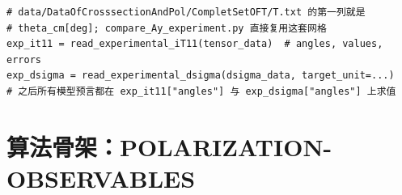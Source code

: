 \begin{lstlisting}[style=python, caption={从 T.txt 取实验角度网格}, label={lst:ch13-angles-from-exp}]
# data/DataOfCrosssectionAndPol/CompletSetOFT/T.txt 的第一列就是
# theta_cm[deg]; compare_Ay_experiment.py 直接复用这套网格
exp_it11 = read_experimental_iT11(tensor_data)  # angles, values, errors
exp_dsigma = read_experimental_dsigma(dsigma_data, target_unit=...)
# 之后所有模型预言都在 exp_it11["angles"] 与 exp_dsigma["angles"] 上求值
\end{lstlisting}

\section{算法骨架：POLARIZATION-OBSERVABLES}
\label{sec:ch13-algorithm}

